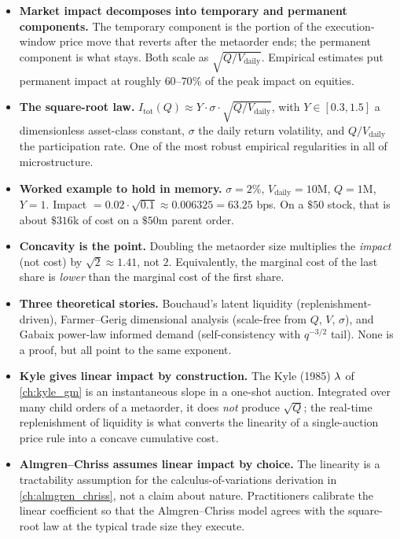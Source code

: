 \begin{itemize}
  \item \textbf{Market impact decomposes into temporary and
  permanent components.} The temporary component is the portion of
  the execution-window price move that reverts after the metaorder
  ends; the permanent component is what stays. Both scale as
  $\sqrt{Q / V_{\text{daily}}}$. Empirical estimates put permanent
  impact at roughly $60$--$70\%$ of the peak impact on equities.
  \item \textbf{The square-root law.} $I_{\text{tot}}(Q) \approx
  Y \cdot \sigma \cdot \sqrt{Q / V_{\text{daily}}}$, with $Y \in
  [0.3, 1.5]$ a dimensionless asset-class constant, $\sigma$ the
  daily return volatility, and $Q / V_{\text{daily}}$ the
  participation rate. One of the most robust empirical regularities
  in all of microstructure.
  \item \textbf{Worked example to hold in memory.} $\sigma = 2\%$,
  $V_{\text{daily}} = 10$M, $Q = 1$M, $Y = 1$. Impact $=
  0.02 \cdot \sqrt{0.1} \approx 0.006325 = 63.25$ bps. On a
  $\$50$ stock, that is about $\$316$k of cost on a $\$50$m
  parent order.
  \item \textbf{Concavity is the point.} Doubling the metaorder
  size multiplies the \emph{impact} (not cost) by $\sqrt{2} \approx
  1.41$, not $2$. Equivalently, the marginal cost of the last
  share is \emph{lower} than the marginal cost of the first share.
  \item \textbf{Three theoretical stories.} Bouchaud's latent
  liquidity (replenishment-driven), Farmer--Gerig dimensional
  analysis (scale-free from $Q$, $V$, $\sigma$), and Gabaix power-law
  informed demand (self-consistency with $q^{-3/2}$ tail). None is
  a proof, but all point to the same exponent.
  \item \textbf{Kyle gives linear impact by construction.} The
  Kyle (1985) $\lambda$ of \cref{ch:kyle_gm} is an instantaneous
  slope in a one-shot auction. Integrated over many child orders of
  a metaorder, it does \emph{not} produce $\sqrt{Q}$; the real-time
  replenishment of liquidity is what converts the linearity of a
  single-auction price rule into a concave cumulative cost.
  \item \textbf{Almgren--Chriss assumes linear impact by choice.}
  The linearity is a tractability assumption for the
  calculus-of-variations derivation in \cref{ch:almgren_chriss},
  not a claim about nature. Practitioners calibrate the linear
  coefficient so that the Almgren--Chriss model agrees with the
  square-root law at the typical trade size they execute.

\end{itemize}
